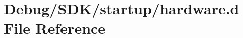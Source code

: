 \hypertarget{_debug_2_s_d_k_2startup_2hardware_8d}{}\section{Debug/\+S\+D\+K/startup/hardware.d File Reference}
\label{_debug_2_s_d_k_2startup_2hardware_8d}
